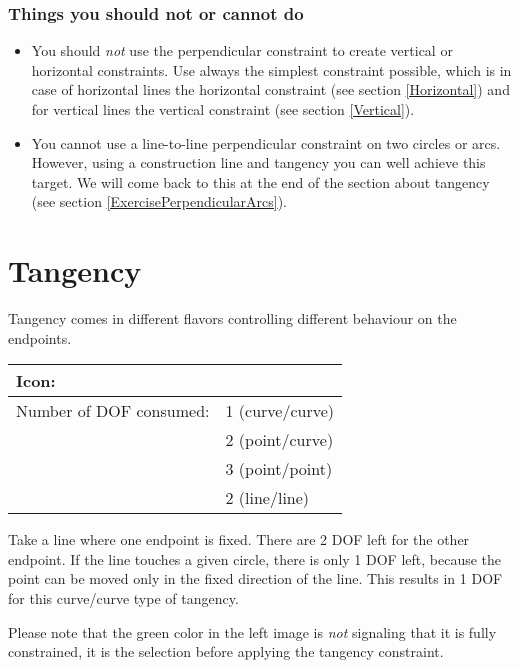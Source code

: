 \documentclass[12pt,titlepage]{article}
\newcommand{\icon}[1]{\raisebox{-1em}{\rule{0pt}{27pt}\texttt{[image: images/\#1]}}}
\newcommand{\dofConsumed}{Number of DOF consumed:}
\begin{document}
\begin {itemize}
\subsubsection*{Things you should not or cannot do}
\begin{itemize}
\item You should \emph{not} use the perpendicular constraint to create
      vertical or horizontal constraints. Use always the simplest constraint
      possible, which is in case of horizontal lines the horizontal constraint
      (see section \vref{Horizontal}) and for vertical lines the vertical constraint
      (see section \vref{Vertical}).
\item You cannot use a line-to-line perpendicular constraint on two circles
      or arcs. However, using a construction line and tangency you can well achieve this
      target. We will come back to this at the end of the section about
      tangency (see section \vref{ExercisePerpendicularArcs}).
\end{itemize}

\section{Tangency}
\label{Tangency}
Tangency comes in different flavors controlling different behaviour on the endpoints.

\begin{tabular}{|l|l|}
\hline
Icon: & \icon{Constraint_Tangent}\\
\hline
\dofConsumed & 1 (curve/curve) \\
             & 2 (point/curve) \\
             & 3 (point/point) \\
             & 2 (line/line) \\
\hline
\end{tabular}

\begin{description}
\newcommand{\height}{6.2cm}
\item [Curve to curve, including line to curve] Take a line where one endpoint is fixed. There are 2 DOF left for the other
      endpoint. If the line touches a given circle, there is only 1 DOF
      left, because the point can be moved only in the fixed direction of the line.
      This results in 1 DOF for this curve/curve type of tangency.
      
      Please note that the green color in the left image is \emph{not} signaling that
      it is fully constrained, it is the selection before applying the tangency
      constraint.


\end{description}
\end{itemize}
\end{document}

